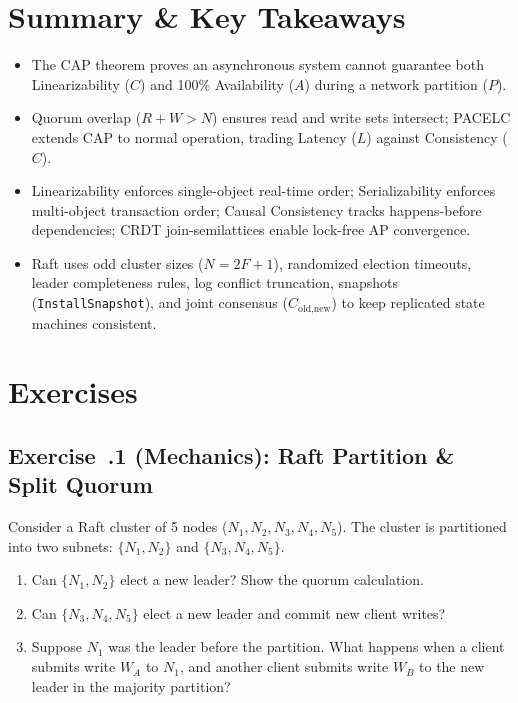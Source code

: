 \section{Summary \protect\& Key Takeaways}
\begin{itemize}[leftmargin=18pt]
  \item The CAP theorem proves an asynchronous system cannot guarantee both Linearizability ($C$) and 100\% Availability ($A$) during a network partition ($P$).
  \item Quorum overlap ($R + W > N$) ensures read and write sets intersect; PACELC extends CAP to normal operation, trading Latency ($L$) against Consistency ($C$).
  \item Linearizability enforces single-object real-time order; Serializability enforces multi-object transaction order; Causal Consistency tracks happens-before dependencies; CRDT join-semilattices enable lock-free AP convergence.
  \item Raft uses odd cluster sizes ($N=2F+1$), randomized election timeouts, leader completeness rules, log conflict truncation, snapshots (\texttt{InstallSnapshot}), and joint consensus ($C_{\text{old,new}}$) to keep replicated state machines consistent.
\end{itemize}

\section{Exercises}

\subsection*{Exercise~\thechapter.1 (Mechanics): Raft Partition \& Split Quorum}
Consider a Raft cluster of 5 nodes ($N_1, N_2, N_3, N_4, N_5$). The cluster is partitioned into two subnets: $\{N_1, N_2\}$ and $\{N_3, N_4, N_5\}$.
\begin{enumerate}[leftmargin=18pt]
  \item Can $\{N_1, N_2\}$ elect a new leader? Show the quorum calculation.
  \item Can $\{N_3, N_4, N_5\}$ elect a new leader and commit new client writes?
  \item Suppose $N_1$ was the leader before the partition. What happens when a client submits write $W_A$ to $N_1$, and another client submits write $W_B$ to the new leader in the majority partition?
\end{enumerate}


